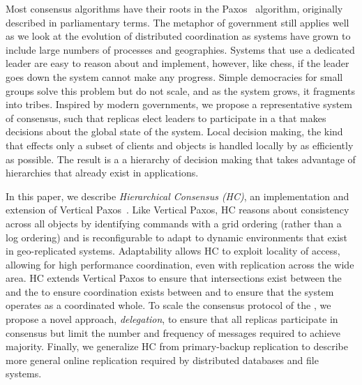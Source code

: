 \documentclass[10pt,twocolumn]{article}
\begin{document}
Most consensus algorithms have their roots in the Paxos~\cite{paxos}
algorithm, originally described in parliamentary terms.
The metaphor of government still applies well as we look at the evolution of
distributed coordination as systems have grown to include large numbers of
processes and geographies.
Systems that use a dedicated leader are easy to reason about and implement,
however, like chess, if the leader goes down the system cannot make any
progress.
Simple democracies for small groups solve this problem but do not scale, and
as the system grows, it fragments into tribes.
Inspired by modern governments, we propose a representative system of
consensus, such that replicas elect leaders to participate in a \roo that
makes decisions about the global state of the system.
Local decision making, the kind that effects only a subset of clients and
objects is handled locally by \subs as efficiently as possible.
The result is a a hierarchy of decision making that takes advantage of
hierarchies that already exist in applications.


In this paper, we describe \emph{Hierarchical Consensus (HC)}, an
implementation and extension of Vertical Paxos~\cite{vertical_paxos}.
Like Vertical Paxos, HC reasons about consistency across all objects by
identifying commands with a grid ordering (rather than a log ordering) and is
reconfigurable to adapt to dynamic environments that exist in geo-replicated
systems.
Adaptability allows HC to exploit locality of access, allowing for high
performance coordination, even with replication across the wide area.
HC extends Vertical Paxos to ensure that intersections exist between the
\subs and the \roo to ensure coordination exists between \subs and to ensure
that the system operates as a coordinated whole.
To scale the consensus protocol of the \roo, we propose a novel approach,
\emph{delegation}, to ensure that all replicas participate in consensus but
limit the number and frequency of messages required to achieve majority.
Finally, we generalize HC from primary-backup replication to describe more
general online replication required by distributed databases and file
systems.

\end{document}
